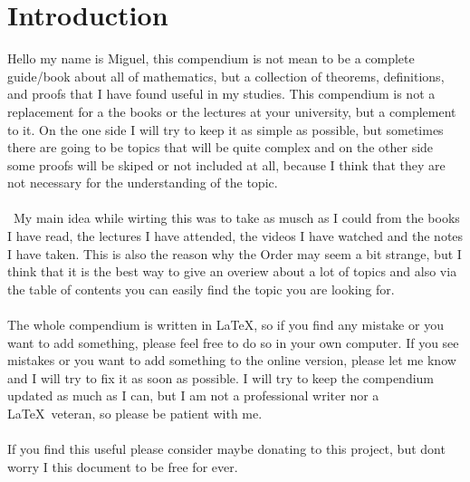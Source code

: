\section{Introduction}

Hello my name is Miguel, this compendium is not mean to be a complete 
guide/book about all of mathematics,
but a collection of theorems, definitions, and proofs that I have found useful in my studies.
This compendium is not a replacement for a the books or the lectures at your university, but a complement to it.
On the one side I will try to keep it as simple as possible, but sometimes there are going to be topics that will be quite 
complex and on the other side some proofs will be 
skiped or not included at all, because I think that they 
are not necessary for the understanding of the topic.
\\\\\
My main idea while wirting this was to take as musch as I could from the books I have read, the lectures 
I have attended, the videos I have watched 
and the notes I have taken. This is also the reason why the Order may seem a bit strange, 
but I think that it is the best way to give an overiew about a lot of topics and also via the table of contents you can
easily find the topic you are looking for.
\\\\
The whole compendium is written in \LaTeX, so if you find any mistake or you want to add something, please 
feel free to do so in your own computer. If you see mistakes or you want to add something to the online version, please
let me know and I will try to fix it as soon as possible.
I will try to keep the compendium updated as much as 
I can, but I am not a professional writer nor a \LaTeX\ veteran, so please be patient with me.
\\\\
If you find this useful please consider maybe donating
to this project, but dont worry I this document to be free for ever.


\newpage